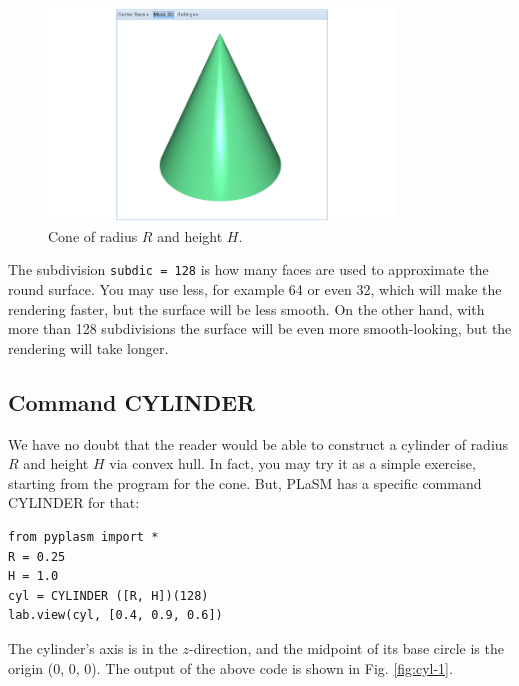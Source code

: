 \documentclass[article,A4,12pt]{llncs}
\begin{document}
\begin{figure}[!ht]
\begin{center}
\includegraphics[width=0.82\textwidth]{img/convexhull-2.png}
\end{center}
\vspace{-2mm}
\caption{Cone of radius $R$ and height $H$.}
\label{fig:convexhull-2}
\vspace{-1cm}
\end{figure}
\newpage
The subdivision {\tt subdic = 128} is how many
faces are used to approximate the round surface. You may use less, 
for example 64 or even 32, which will make the rendering faster, but
the surface will be less smooth. On the other hand, with more than 
128 subdivisions the surface will be even more smooth-looking, but 
the rendering will take longer.

\subsection{Command CYLINDER}

We have no doubt that the reader would be able to construct 
a cylinder of radius $R$ and height $H$ via convex hull. 
In fact, you may try it as a simple exercise, starting from 
the program for the cone. But, PLaSM has a specific command
CYLINDER for that:

\begin{verbatim}
from pyplasm import *
R = 0.25
H = 1.0
cyl = CYLINDER ([R, H])(128)
lab.view(cyl, [0.4, 0.9, 0.6])
\end{verbatim}
The cylinder's axis is in the $z$-direction, and the midpoint of
its base circle is the origin (0, 0, 0). 
The output of the above code is shown in Fig. \ref{fig:cyl-1}.
\end{document}

